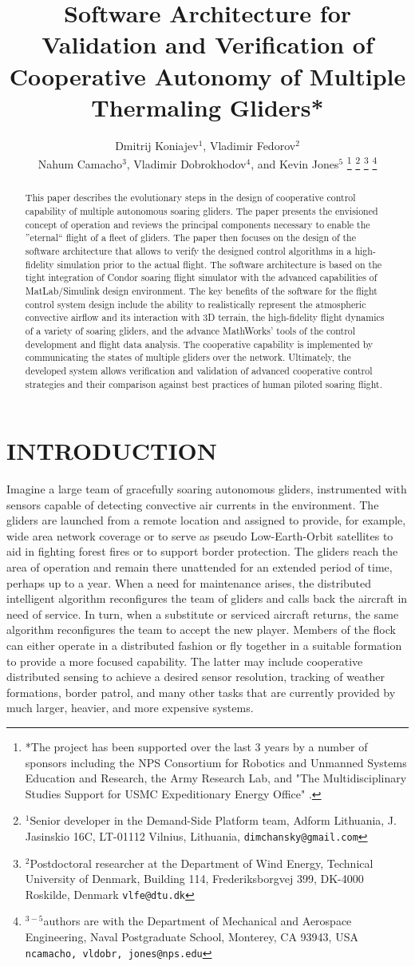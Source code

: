 \documentclass[letterpaper, 10 pt, conference]{ieeeconf}  %
\title{\LARGE \bf
Software Architecture for Validation and Verification of Cooperative Autonomy of Multiple Thermaling Gliders* }
\author{Dmitrij Koniajev$^{1}$, Vladimir Fedorov$^{2}$ \\
    Nahum Camacho$^{3}$, Vladimir Dobrokhodov$^{4}$, and Kevin Jones$^{5}$%
\thanks{*The project has been supported over the last 3 years by a number of
sponsors including the NPS Consortium for Robotics and Unmanned Systems Education and Research, the Army Research Lab, and "The Multidisciplinary
Studies Support for USMC Expeditionary Energy Office" .}%
\thanks{$^{1}$Senior developer in the Demand-Side Platform team,
        Adform Lithuania, J. Jasinskio 16C, LT-01112 Vilnius, Lithuania,
        {\tt\small {dimchansky@gmail.com}}}%
\thanks{$^{2}$Postdoctoral researcher at the Department of Wind Energy,
        Technical University of Denmark, Building 114, Frederiksborgvej 399, DK-4000 Roskilde,
        Denmark
        {\tt\small {vlfe@dtu.dk}}}%
\thanks{$^{3-5}$authors are with the Department of Mechanical and Aerospace Engineering,
        Naval Postgraduate School, Monterey, CA 93943, USA
        {\tt\small {ncamacho, vldobr, jones}@nps.edu}}%
} %
\newcommand{\squeezeup}{\vspace{-1.0mm}}
\begin{document}
\maketitle \thispagestyle{empty} \pagestyle{empty}


\begin{abstract}
This paper describes the evolutionary steps in the design of cooperative control capability of multiple autonomous soaring gliders. The paper presents the envisioned concept of operation and reviews the principal components necessary to enable the ''eternal`` flight of a fleet of gliders. The paper then focuses on the design of the software architecture that allows to verify the designed control algorithms in a high-fidelity simulation prior to the actual flight. The software architecture is based on the tight integration of Condor soaring flight simulator with the advanced capabilities of MatLab/Simulink design environment. The key benefits of the software for the flight control system design include the ability to realistically represent the atmospheric convective airflow and its interaction with 3D terrain, the high-fidelity flight dynamics of a variety of soaring gliders, and the advance MathWorks' tools of the control development and flight data analysis. The cooperative capability is implemented by communicating the states of multiple gliders over the network. Ultimately, the developed system allows verification and validation of advanced cooperative control strategies and their comparison against best practices of human piloted soaring flight.
\end{abstract}


\section{INTRODUCTION}
\squeezeup
Imagine a large team of gracefully soaring autonomous gliders, instrumented with sensors capable of detecting convective air currents in the environment. The gliders are launched from a remote location and assigned to provide, for example, wide area network coverage or to serve as pseudo Low-Earth-Orbit satellites to aid in fighting forest fires or to support border protection. The gliders reach the area of operation and remain there unattended for an extended period of time, perhaps up to a year. When a need for maintenance arises, the distributed intelligent algorithm reconfigures the team of gliders and calls back the aircraft in need of service. In turn, when a substitute or serviced aircraft returns, the same algorithm reconfigures the team to accept the new player. Members of the flock can either operate in a distributed fashion or fly together in a suitable formation to provide a more focused capability. The latter may include cooperative distributed sensing to achieve a desired sensor resolution, tracking of weather formations, border patrol, and many other tasks that are currently provided by much larger, heavier, and more expensive systems.
\end{document}
